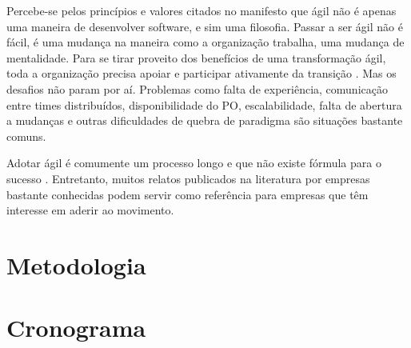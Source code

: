 \documentclass[a4paper,11pt]{article}
\begin{document}
Percebe-se pelos princípios e valores citados no manifesto que ágil não é apenas uma maneira de desenvolver software, e sim uma filosofia. Passar a ser ágil não é fácil, é uma mudança na maneira como a organização trabalha, uma mudança de mentalidade. Para se tirar proveito dos benefícios de uma transformação ágil, toda a organização precisa apoiar e participar ativamente da transição \cite{Kirsi2013}. Mas os desafios não param por aí. Problemas como falta de experiência, comunicação entre times distribuídos, disponibilidade do PO, escalabilidade, falta de abertura a mudanças e  outras dificuldades de quebra de paradigma são situações bastante comuns.

Adotar ágil é comumente um processo longo e que não existe fórmula para o sucesso \cite{Block2011}. Entretanto, muitos relatos publicados na literatura por empresas bastante conhecidas \cite{Adobe2012,Microsoft2013,NHN2012} podem servir como referência para empresas que têm interesse em aderir ao movimento.

\section{Metodologia}

\section{Cronograma}



\end{document}
